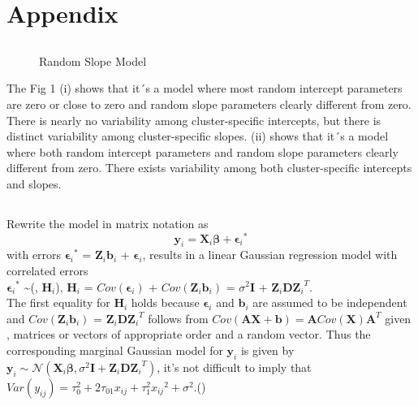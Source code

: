 \documentclass[12pt]{article}
\newcommand\pN{\mathcal{N}}
\begin{document}
\section{Appendix}
\subsection{}
\renewcommand{\figurename}{Fig.} 
\renewcommand{\captionlabeldelim}{.~} 
\renewcommand{\thesubfigure}{(\roman{subfigure})}
\makeatletter \renewcommand{\@thesubfigure}{\thesubfigure \space}
\renewcommand{\p@subfigure}{} \makeatother
\begin{figure}[H]
\centering  
{}
\caption{Random Slope Model}
\label{Fig.main}
\end{figure}
The Fig 1 (i) shows that it´s a model where most random intercept parameters are zero or close to zero and random slope parameters clearly different from zero. There is nearly no variability among cluster-specific intercepts, but there is distinct variability among cluster-specific slopes. (ii) shows that it´s a model where both random intercept parameters and random slope parameters clearly different from zero. There exists variability among both cluster-specific intercepts and slopes.
\subsection{}
Rewrite the model in matrix notation as 
\begin{equation}
    \boldsymbol{y}_i = \boldsymbol{X}_i\boldsymbol{\beta} + {\boldsymbol{\epsilon}_i}^*
\end{equation}
with errors ${\boldsymbol{\epsilon}_i}^*$ = $\boldsymbol{Z}_i\boldsymbol{b}_i$ + $\boldsymbol{\epsilon}_i$, results in a linear Gaussian regression model with correlated errors
\\ ${\boldsymbol{\epsilon}_i}^*$ \sim \pN(, $\boldsymbol{H}_i$), $\boldsymbol{H}_i$ = $Cov(\boldsymbol{\epsilon}_i)$ + $Cov(\boldsymbol{Z}_i\boldsymbol{b}_i)$ = $\sigma^2\boldsymbol{I}$ + $\boldsymbol{Z}_i\boldsymbol{D}{\boldsymbol{Z}_i}^T$.
\\The first equality for $\boldsymbol{H}_i$ holds because $\boldsymbol{\epsilon}_i$ and $\boldsymbol{b}_i$ are assumed to be independent and $Cov(\boldsymbol{Z}_i\boldsymbol{b}_i)$ = $\boldsymbol{Z}_i\boldsymbol{D}{\boldsymbol{Z}_i}^T$ follows from $Cov(\boldsymbol{AX} + \boldsymbol{b}) = \boldsymbol{A}Cov(\boldsymbol{X}){\boldsymbol{A}}^T$ given ,  matrices or vectors of appropriate order and  a random vector. Thus the corresponding marginal Gaussian model for $\boldsymbol{y}_i$ is given by 
$\boldsymbol{y}_i \sim \pN(\boldsymbol{X}_i\boldsymbol{\beta}, \sigma^2\boldsymbol{I}+\boldsymbol{Z}_i\boldsymbol{D}{\boldsymbol{Z}_i}^T)$, it's not difficult to imply that $Var(y_{ij}) = \tau_0^2 + 2\tau_{01}x_{ij} + \tau_1^2{x_{ij}}^2 + \sigma^2$.(\cite{Fahrmeir})



      
 
\end{document}

